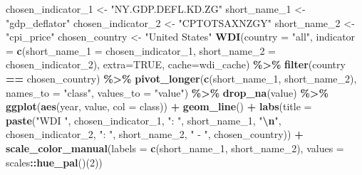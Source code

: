 \documentclass[
  xelatex, ja=standard]{bxjsbook}
\newenvironment{Shaded}{\begin{snugshade}}{\end{snugshade}}
\newcommand{\AttributeTok}[1]{\textcolor[rgb]{0.13,0.29,0.53}{#1}}
\newcommand{\ConstantTok}[1]{\textcolor[rgb]{0.56,0.35,0.01}{#1}}
\newcommand{\DecValTok}[1]{\textcolor[rgb]{0.00,0.00,0.81}{#1}}
\newcommand{\FunctionTok}[1]{\textcolor[rgb]{0.13,0.29,0.53}{\textbf{#1}}}
\newcommand{\NormalTok}[1]{#1}
\newcommand{\OtherTok}[1]{\textcolor[rgb]{0.56,0.35,0.01}{#1}}
\newcommand{\SpecialCharTok}[1]{\textcolor[rgb]{0.81,0.36,0.00}{\textbf{#1}}}
\newcommand{\StringTok}[1]{\textcolor[rgb]{0.31,0.60,0.02}{#1}}
\theoremstyle{definition}
\theoremstyle{definition}
\theoremstyle{definition}
\theoremstyle{definition}
\theoremstyle{remark}
\begin{document}
\begin{Shaded}
\begin{Highlighting}[]
\NormalTok{chosen\_indicator\_1 }\OtherTok{\textless{}{-}} \StringTok{"NY.GDP.DEFL.KD.ZG"}
\NormalTok{short\_name\_1 }\OtherTok{\textless{}{-}} \StringTok{"gdp\_deflator"}
\NormalTok{chosen\_indicator\_2 }\OtherTok{\textless{}{-}} \StringTok{"CPTOTSAXNZGY"}
\NormalTok{short\_name\_2 }\OtherTok{\textless{}{-}} \StringTok{"cpi\_price"}
\NormalTok{chosen\_country }\OtherTok{\textless{}{-}} \StringTok{"United States"}
\FunctionTok{WDI}\NormalTok{(}\AttributeTok{country =} \StringTok{"all"}\NormalTok{, }\AttributeTok{indicator =} \FunctionTok{c}\NormalTok{(}\AttributeTok{short\_name\_1 =}\NormalTok{ chosen\_indicator\_1, }\AttributeTok{short\_name\_2 =}\NormalTok{ chosen\_indicator\_2), }\AttributeTok{extra=}\ConstantTok{TRUE}\NormalTok{, }\AttributeTok{cache=}\NormalTok{wdi\_cache) }\SpecialCharTok{\%\textgreater{}\%} 
  \FunctionTok{filter}\NormalTok{(country }\SpecialCharTok{==}\NormalTok{ chosen\_country) }\SpecialCharTok{\%\textgreater{}\%} 
  \FunctionTok{pivot\_longer}\NormalTok{(}\FunctionTok{c}\NormalTok{(short\_name\_1, short\_name\_2), }\AttributeTok{names\_to =} \StringTok{"class"}\NormalTok{, }\AttributeTok{values\_to =} \StringTok{"value"}\NormalTok{) }\SpecialCharTok{\%\textgreater{}\%} \FunctionTok{drop\_na}\NormalTok{(value) }\SpecialCharTok{\%\textgreater{}\%}
  \FunctionTok{ggplot}\NormalTok{(}\FunctionTok{aes}\NormalTok{(year, value, }\AttributeTok{col =}\NormalTok{ class)) }\SpecialCharTok{+} \FunctionTok{geom\_line}\NormalTok{() }\SpecialCharTok{+}
  \FunctionTok{labs}\NormalTok{(}\AttributeTok{title =} \FunctionTok{paste}\NormalTok{(}\StringTok{"WDI "}\NormalTok{, chosen\_indicator\_1, }\StringTok{": "}\NormalTok{, short\_name\_1, }\StringTok{"}\SpecialCharTok{\textbackslash{}n}\StringTok{"}\NormalTok{, chosen\_indicator\_2, }\StringTok{": "}\NormalTok{, short\_name\_2, }\StringTok{" {-} "}\NormalTok{, chosen\_country)) }\SpecialCharTok{+}
  \FunctionTok{scale\_color\_manual}\NormalTok{(}\AttributeTok{labels =} \FunctionTok{c}\NormalTok{(short\_name\_1, short\_name\_2), }\AttributeTok{values =}\NormalTok{ scales}\SpecialCharTok{::}\FunctionTok{hue\_pal}\NormalTok{()(}\DecValTok{2}\NormalTok{))}
\end{Highlighting}
\end{Shaded}
\end{document}
